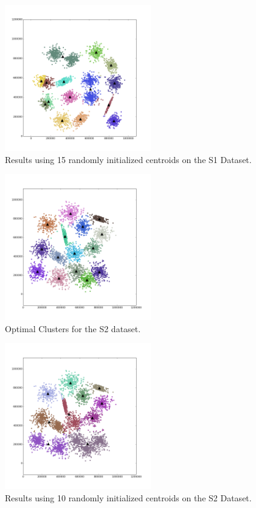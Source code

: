 \documentclass[journal]{IEEEtran}
\begin{document}
\begin{figure}[!t]
	\centering
	\includegraphics[width=2.5in]{../figs/s1_rand_euclid_15.png}
	\caption{Results using 15 randomly initialized centroids on the S1 Dataset.}
	\label{fig_sim}
\end{figure}

\begin{figure}[!t]
	\centering
	\includegraphics[width=2.5in]{../figs/s2_true_euclid_15.png}
	\caption{Optimal Clusters for the S2 dataset.}
	\label{fig_sim}
\end{figure}


\begin{figure}[!t]
	\centering
	\includegraphics[width=2.5in]{../figs/s2_rand_euclid_10.png}
	\caption{Results using 10 randomly initialized centroids on the S2 Dataset.}
	\label{fig_sim}
\end{figure}
\end{document}

